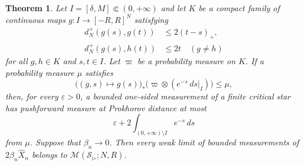 \documentclass{amsart}
\numberwithin{equation}{section}
\theoremstyle{plain}
\newtheorem{theorem}{Theorem}[section]
\theoremstyle{definition}
\theoremstyle{remark}
\newcommand{\eps}{\varepsilon}
\begin{document}
\begin{theorem}\label{thm:finite-profile-quantization}
Let $I=[\delta,M]\Subset(0,+\infty)$ and let $K$ be a compact family of continuous maps $g\colon I\to[-R,R]^N$ satisfying
\begin{align}
d_N^+(g(s),g(t))&\le2(t-s)_+, \label{eq:star-profile-same}\\
d_N^+(g(s),h(t))&\le2t \quad(g\ne h) \label{eq:star-profile-cross}
\end{align}
for all $g,h\in K$ and $s,t\in I$.  Let $\varpi$ be a probability measure on $K$.  If a probability measure $\mu$ satisfies
\begin{equation}\label{eq:star-evaluation-submeasure} \bigl((g,s)\mapsto g(s)\bigr)_* \bigl(\varpi\otimes(e^{-s}\,ds|_I)\bigr)\le\mu, \end{equation}
then, for every $\eps>0$, a bounded one-sided measurement of a finite critical star has pushforward measure at Prokhorov distance at most
\begin{equation}\label{eq:star-quantization-error} \eps+2\int_{(0,+\infty)\setminus I}e^{-s}\,ds \end{equation}
from $\mu$.  Suppose that $\beta_n\to0$.  Then every weak limit of bounded measurements of $2\beta_n\widehat X_n$ belongs to $\mathcal M(\mathcal S_{\rhd};N,R)$.
\end{theorem}
\end{document}
